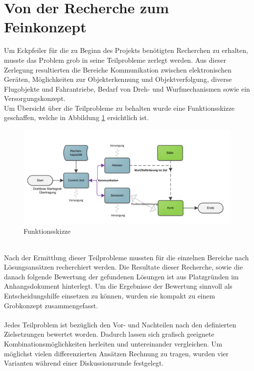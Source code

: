 \section{Von der Recherche zum Feinkonzept}
Um Eckpfeiler für die zu Beginn des Projekts benötigten Recherchen zu erhalten, musste das
Problem grob in seine Teilprobleme zerlegt werden. Aus dieser Zerlegung resultierten die
Bereiche Kommunikation zwischen elektronischen Geräten, Möglichkeiten zur Objekterkennung und
Objektverfolgung, diverse Flugobjekte und Fahrantriebe, Bedarf von Dreh- und Wurfmechanismen
sowie ein Versorgungskonzept. \\
Um Übersicht über die Teilprobleme zu behalten wurde eine Funktionsskizze geschaffen, welche
in  Abbildung \ref{fig:Funktionsskizze} ersichtlich ist.\\
\begin{figure}[h!]
	\centering
	\includegraphics[width=1\textwidth]{Enddokumentation/Varianten/Bilder/Funktionsskizze.png}
	\caption{Funktionsskizze}
	\label{fig:Funktionsskizze}
\end{figure}
\\
Nach der Ermittlung dieser Teilprobleme mussten für die einzelnen Bereiche nach Lösungsansätzen
recherchiert werden. Die Resultate dieser Recherche, sowie die danach folgende Bewertung der
gefundenen Lösungen ist aus Platzgründen im Anhangsdokument hinterlegt. Um die Ergebnisse der Bewertung
sinnvoll als Entscheidungshilfe einsetzen zu können, wurden sie kompakt zu einem Grobkonzept
zusammengefasst.\\
\\
Jedes Teilproblem ist bezüglich den Vor- und Nachteilen nach den definierten Zielsetzungen
bewertet worden. Dadurch lassen sich grafisch geeignete Kombinationsmöglichkeiten herleiten und
untereinander vergleichen. Um möglichst vielen differenzierten Ansätzen Rechnung zu tragen,
wurden vier Varianten während einer Diskussionsrunde festgelegt.
\newpage
